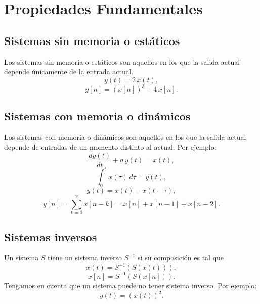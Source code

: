 \documentclass[11pt,a4paper,openany]{book}
\begin{document}
	\section{Propiedades Fundamentales}
	
	\subsection{Sistemas sin memoria o estáticos}
	Los sistemas sin memoria o estáticos son aquellos en los que la salida actual depende únicamente de la entrada actual.
	\begin{equation}
		y(t) = 2 \, x(t),
	\end{equation}
	\begin{equation}
		y[n] = (x[n])^{3} + 4 \, x[n].
	\end{equation}
	
	\subsection{Sistemas con memoria o dinámicos}
	Los sistemas con memoria o dinámicos son aquellos en los que la salida actual depende de entradas de un momento distinto al actual. Por ejemplo:
	\begin{equation}
		\frac{dy(t)}{dt} + a \, y(t) = x(t),
	\end{equation}
	\begin{equation}
		\int_{0}^{t} x(\tau) \, d\tau = y(t),
	\end{equation}
	\begin{equation}
		y(t)=x(t)-x(t-\tau ),
	\end{equation}
	\begin{equation}
		y[n] = \sum_{k=0}^{2}x[n-k] = x[n] + x[n-1] + x[n-2].
	\end{equation}
		
\subsection{Sistemas inversos}
Un sistema $S$ tiene un sistema inverso $S^{-1}$ si su composición es tal que
\begin{equation}
	x(t) = S^{-1}(S(x(t))),
\end{equation}
\begin{equation}
	x[n] = S^{-1}(S(x[n])).
\end{equation}
Tengamos en cuenta que un sistema puede no tener sistema inverso. Por ejemplo:
\begin{equation}
	y(t) = (x(t))^{2}.
\end{equation}
\end{document}
